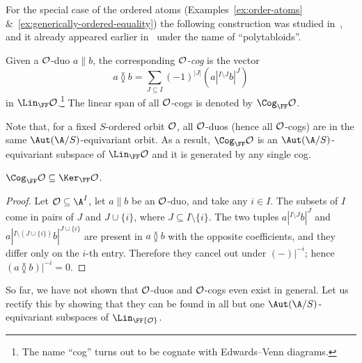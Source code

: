 For the special case of the ordered atoms (Examples~\ref{ex:order-atoms} \&~\ref{ex:generically-ordered-equality}) the following construction was studied in~\cite[p.~11]{BFKM24}, and it already appeared earlier in~\cite[p.~125]{Gray97} under the name of ``polytabloids''.

\begin{definition}
    Given a $\cal O$-duo $a \parallel b$, the corresponding \emph{$\cal O$-cog} is the vector
    \[
        a \between b =
        \sum_{J \subseteq I} (-1)^{|J|}
        (a|^{I \setminus J} b|^{J})
    \]
    in $\Lin_\FF \cal O$.\footnote{The name ``cog'' turns out to be cognate with Edwards--Venn diagrams.}
    The linear span of all $\cal O$-cogs is denoted by $\Cog_\FF \cal O$.
\end{definition}
Note that, for a fixed $S$-ordered orbit $\cal O$, all $\cal O$-duos (hence all $\cal O$-cogs) are in the same $\Aut(\A/S)$-equivariant orbit.
As a result, $\Cog_\FF \cal O$ is an $\Aut(\A/S)$-equivariant subspace of $\Lin_\FF \cal O$ and it is generated by any single cog.

\begin{claim}\label{claim:cogs-are-balanced}
    $\Cog_\FF \cal O\subseteq \Ker_\FF \cal O$.
\end{claim}
\begin{proof}
    Let $\cal O \subseteq \A^I$, let $a\parallel b$ be an $\cal O$-duo, and take any $i \in I$.
    The subsets of $I$ come in pairs of $J$ and $J \cup \{i\}$, where $J\subseteq I \setminus \{i\}$.
    The two tuples $a|^{I\setminus J} b|^{J}$ and $a|^{I \setminus (J \cup \{i\})}b|^{J \cup \{i\}}$ are present in 
    $a\between b$ with the opposite coefficients, and they differ only on the $i$-th entry.
    Therefore they cancel out under $(-)|^{-i}$; hence $(a \between b )|^{-i} = 0$.
\end{proof}

So far, we have not shown that $\cal O$-duos and $\cal O$-cogs even exist in general.
Let us rectify this by showing that they can be found in all but one $\Aut(\A/S)$-equivariant subspaces of $\Lin_\FF{\cal O}$.


